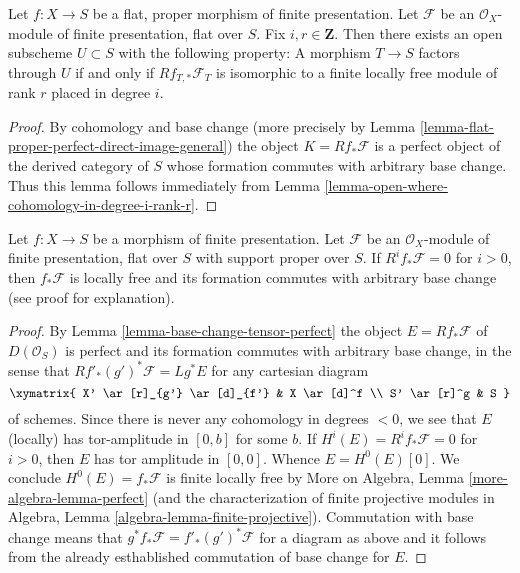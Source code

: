 \begin{lemma}
\label{lemma-open-where-cohomology-in-degree-i-rank-r-geometric}
Let $f : X \to S$ be a flat, proper morphism of finite presentation.
Let $\mathcal{F}$ be an $\mathcal{O}_X$-module of finite presentation,
flat over $S$. Fix $i, r \in \mathbf{Z}$.
Then there exists an open subscheme
$U \subset S$ with the following property:
A morphism $T \to S$ factors through $U$ if and only if
$Rf_{T, *}\mathcal{F}_T$ is isomorphic to a
finite locally free module of rank $r$ placed in degree $i$.
\end{lemma}

\begin{proof}
By cohomology and base change (more precisely by
Lemma \ref{lemma-flat-proper-perfect-direct-image-general})
the object $K = Rf_*\mathcal{F}$ is a perfect object of the derived
category of $S$ whose formation commutes with arbitrary base change.
Thus this lemma follows immediately from
Lemma \ref{lemma-open-where-cohomology-in-degree-i-rank-r}.
\end{proof}

\begin{lemma}
\label{lemma-vanishing-implies-locally-free}
Let $f : X \to S$ be a morphism of finite presentation.
Let $\mathcal{F}$ be an $\mathcal{O}_X$-module of finite presentation,
flat over $S$ with support proper over $S$. If $R^if_*\mathcal{F} = 0$
for $i > 0$, then $f_*\mathcal{F}$ is locally free and its formation
commutes with arbitrary base change (see proof for explanation).
\end{lemma}

\begin{proof}
By Lemma \ref{lemma-base-change-tensor-perfect}
the object $E = Rf_*\mathcal{F}$ of $D(\mathcal{O}_S)$
is perfect and its formation commutes with arbitrary base change,
in the sense that $Rf'_*(g')^*\mathcal{F} = Lg^*E$
for any cartesian diagram
$$
\xymatrix{
X' \ar[r]_{g'} \ar[d]_{f'} &
X \ar[d]^f \\
S' \ar[r]^g &
S
}
$$
of schemes.
Since there is never any cohomology in degrees $< 0$, we see that
$E$ (locally) has tor-amplitude in $[0, b]$ for some $b$.
If $H^i(E) = R^if_*\mathcal{F} = 0$ for $i > 0$,
then $E$ has tor amplitude in $[0, 0]$. Whence
$E = H^0(E)[0]$. We conclude $H^0(E) = f_*\mathcal{F}$
is finite locally free by
More on Algebra, Lemma \ref{more-algebra-lemma-perfect}
(and the characterization of finite projective modules
in Algebra, Lemma \ref{algebra-lemma-finite-projective}).
Commutation with base change means that
$g^*f_*\mathcal{F} = f'_*(g')^*\mathcal{F}$ for
a diagram as above and it follows from the already
esthablished commutation of base change for $E$.
\end{proof}

